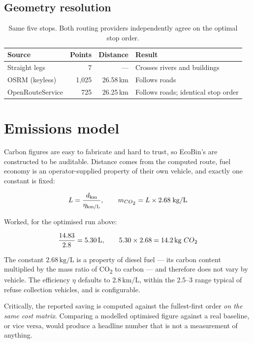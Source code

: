 \documentclass[11pt,a4paper]{article}
\newcommand{\co}{CO\textsubscript{2}}
\begin{document}
\subsection{Geometry resolution}

\begin{table}[h]
\centering\small
\begin{tabular}{lrrl}
\toprule
\textbf{Source} & \textbf{Points} & \textbf{Distance} & \textbf{Result} \\
\midrule
Straight legs        & 7     & ---        & Crosses rivers and buildings \\
OSRM (keyless)       & 1{,}025 & 26.58\,km & Follows roads \\
OpenRouteService     & 725   & 26.25\,km  & Follows roads; identical stop order \\
\bottomrule
\end{tabular}
\caption{Same five stops. Both routing providers independently agree on
the optimal stop order.}
\end{table}

\section{Emissions model}

Carbon figures are easy to fabricate and hard to trust, so EcoBin's are
constructed to be auditable. Distance comes from the computed route, fuel
economy is an operator-supplied property of their own vehicle, and
exactly one constant is fixed:

\[
L = \frac{d_{\text{km}}}{\eta_{\text{km/L}}},
\qquad
m_{\co{}} = L \times 2.68\;\text{kg/L}
\]

Worked, for the optimised run above:

\[
\frac{14.83}{2.8} = 5.30\,\text{L},
\qquad
5.30 \times 2.68 = 14.2\,\text{kg }\co{}
\]

The constant $2.68\,\mathrm{kg/L}$ is a property of diesel fuel --- its
carbon content multiplied by the mass ratio of \co{} to carbon --- and
therefore does not vary by vehicle. The efficiency $\eta$ defaults to
$2.8\,\mathrm{km/L}$, within the 2.5--3 range typical of refuse
collection vehicles, and is configurable.

Critically, the reported saving is computed against the fullest-first
order \emph{on the same cost matrix}. Comparing a modelled optimised
figure against a real baseline, or vice versa, would produce a headline
number that is not a measurement of anything.
\end{document}
